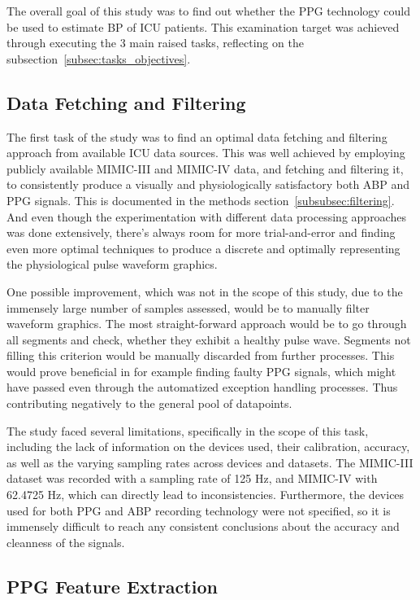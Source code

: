 The overall goal of this study was to find out whether the PPG technology could be used to estimate BP of ICU patients.
This examination target was achieved through executing the 3 main raised tasks, reflecting on the subsection~\ref{subsec:tasks_objectives}.

\subsection{Data Fetching and Filtering}
\label{subsec:data-fetching-and-filtering}

The first task of the study was to find an optimal data fetching and filtering approach from available ICU data sources.
This was well achieved by employing publicly available MIMIC-III and MIMIC-IV data, and fetching and filtering it, to consistently produce a visually and physiologically satisfactory both ABP and PPG signals.
This is documented in the methods section~\ref{subsubsec:filtering}.
And even though the experimentation with different data processing approaches was done extensively, there's always room for more trial-and-error
and finding even more optimal techniques to produce a discrete and optimally representing the physiological pulse waveform graphics.

One possible improvement, which was not in the scope of this study, due to the immensely large number of samples assessed, would be to manually filter waveform graphics.
The most straight-forward approach would be to go through all segments and check, whether they exhibit a healthy pulse wave.
Segments not filling this criterion would be manually discarded from further processes.
This would prove beneficial in for example finding faulty PPG signals, which might have passed even through the automatized exception handling processes.
Thus contributing negatively to the general pool of datapoints.

The study faced several limitations, specifically in the scope of this task, including the lack of information on the devices used, their calibration, accuracy,
as well as the varying sampling rates across devices and datasets.
The MIMIC-III dataset was recorded with a sampling rate of 125 Hz, and MIMIC-IV with 62.4725 Hz, which can directly lead to inconsistencies.
Furthermore, the devices used for both PPG and ABP recording technology were not specified, so it is immensely difficult to reach any consistent conclusions about the accuracy and cleanness of the signals.

\subsection{PPG Feature Extraction}
\label{subsec:ppg-feature-extraction}

